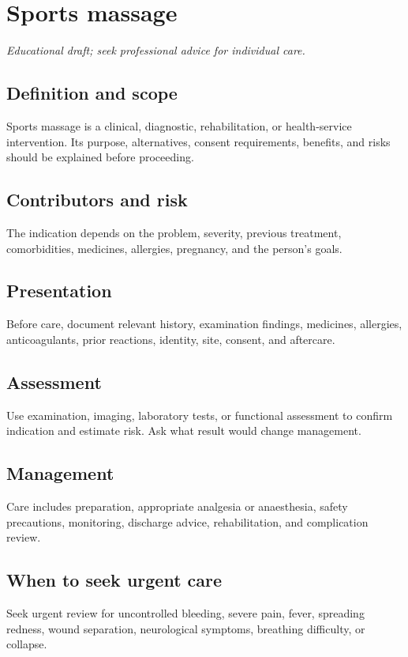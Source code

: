 \chapter{Sports massage}
\medskip
\noindent\textit{Educational draft; seek professional advice for individual care.}

\section*{Definition and scope}
Sports massage is a clinical, diagnostic, rehabilitation, or health-service intervention. Its purpose, alternatives, consent requirements, benefits, and risks should be explained before proceeding.

\section*{Contributors and risk}
The indication depends on the problem, severity, previous treatment, comorbidities, medicines, allergies, pregnancy, and the person’s goals.

\section*{Presentation}
Before care, document relevant history, examination findings, medicines, allergies, anticoagulants, prior reactions, identity, site, consent, and aftercare.

\section*{Assessment}
Use examination, imaging, laboratory tests, or functional assessment to confirm indication and estimate risk. Ask what result would change management.

\section*{Management}
Care includes preparation, appropriate analgesia or anaesthesia, safety precautions, monitoring, discharge advice, rehabilitation, and complication review.

\section*{When to seek urgent care}
Seek urgent review for uncontrolled bleeding, severe pain, fever, spreading redness, wound separation, neurological symptoms, breathing difficulty, or collapse.

